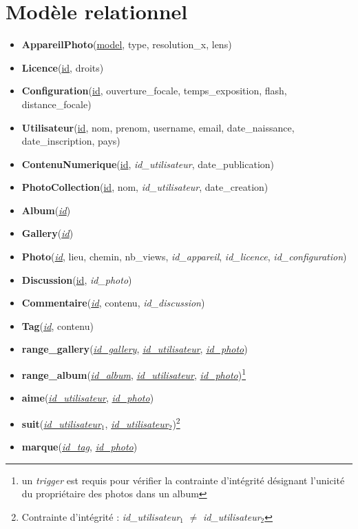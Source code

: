 \documentclass[a4paper,12pt]{article}
\begin{document}
\section{Modèle relationnel}
\begin{itemize}
  \item \textbf{AppareilPhoto}(\underline{model}, type, resolution\_x, lens)
  \item \textbf{Licence}(\underline{id}, droits)
  \item \textbf{Configuration}(\underline{id}, ouverture\_focale, temps\_exposition, flash, distance\_focale)
  \item \textbf{Utilisateur}(\underline{id}, nom, prenom, username, email, date\_naissance, date\_inscription, pays)
  \item \textbf{ContenuNumerique}(\underline{id}, \textit{id\_utilisateur}, date\_publication)
  \item \textbf{PhotoCollection}(\underline{id}, nom, \textit{id\_utilisateur}, date\_creation)
  \item \textbf{Album}(\textit{\underline{id}})
  \item \textbf{Gallery}(\textit{\underline{id}})
  \item \textbf{Photo}(\textit{\underline{id}}, lieu, chemin, nb\_views, \textit{id\_appareil}, \textit{id\_licence}, \textit{id\_configuration})
  \item \textbf{Discussion}(\underline{id}, \textit{id\_photo})
  \item \textbf{Commentaire}(\textit{\underline{id}}, contenu, \textit{id\_discussion})
  \item \textbf{Tag}(\textit{\underline{id}}, contenu)
  \item \textbf{range\_gallery}(\textit{\underline{id\_gallery}}, \textit{\underline{id\_utilisateur}}, \textit{\underline{id\_photo}})
  \item \textbf{range\_album}(\textit{\underline{id\_album}}, \textit{\underline{id\_utilisateur}}, \textit{\underline{id\_photo}})\footnote{un \textit{trigger} est requis pour vérifier la contrainte d'intégrité désignant l'unicité du propriétaire des photos dans un album}
  \item \textbf{aime}(\textit{\underline{id\_utilisateur}}, \textit{\underline{id\_photo}})
  \item \textbf{suit}(\textit{\underline{id\_utilisateur$_1$}}, \textit{\underline{id\_utilisateur$_2$}})\footnote{Contrainte d'intégrité : \textit{id\_utilisateur$_1$} $\neq$ \textit{id\_utilisateur$_2$}}
  \item \textbf{marque}(\textit{\underline{id\_tag}}, \textit{\underline{id\_photo}})
\end{itemize}
\end{document}
